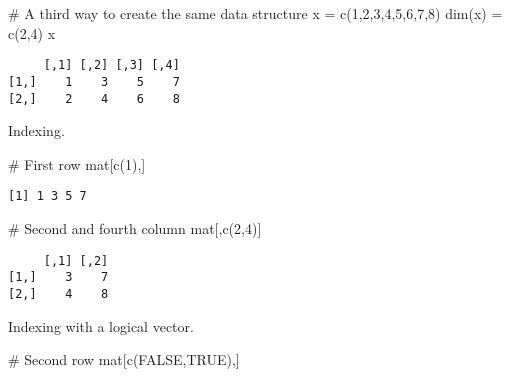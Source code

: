 \documentclass[
  letterpaper,
  DIV=11,
  numbers=noendperiod]{scrartcl}
\newenvironment{Shaded}{\begin{snugshade}}{\end{snugshade}}
\newcommand{\CommentTok}[1]{\textcolor[rgb]{0.37,0.37,0.37}{#1}}
\newcommand{\ConstantTok}[1]{\textcolor[rgb]{0.56,0.35,0.01}{#1}}
\newcommand{\DecValTok}[1]{\textcolor[rgb]{0.68,0.00,0.00}{#1}}
\newcommand{\FunctionTok}[1]{\textcolor[rgb]{0.28,0.35,0.67}{#1}}
\newcommand{\NormalTok}[1]{\textcolor[rgb]{0.00,0.23,0.31}{#1}}
\newcommand{\OtherTok}[1]{\textcolor[rgb]{0.00,0.23,0.31}{#1}}
\begin{document}
\begin{Shaded}
\begin{Highlighting}[]
\CommentTok{\# A third way to create the same data structure}
\NormalTok{x }\OtherTok{=} \FunctionTok{c}\NormalTok{(}\DecValTok{1}\NormalTok{,}\DecValTok{2}\NormalTok{,}\DecValTok{3}\NormalTok{,}\DecValTok{4}\NormalTok{,}\DecValTok{5}\NormalTok{,}\DecValTok{6}\NormalTok{,}\DecValTok{7}\NormalTok{,}\DecValTok{8}\NormalTok{)}
\FunctionTok{dim}\NormalTok{(x) }\OtherTok{=} \FunctionTok{c}\NormalTok{(}\DecValTok{2}\NormalTok{,}\DecValTok{4}\NormalTok{)}
\NormalTok{x}
\end{Highlighting}
\end{Shaded}

\begin{verbatim}
     [,1] [,2] [,3] [,4]
[1,]    1    3    5    7
[2,]    2    4    6    8
\end{verbatim}

Indexing.

\begin{Shaded}
\begin{Highlighting}[]
\CommentTok{\# First row}
\NormalTok{mat[}\FunctionTok{c}\NormalTok{(}\DecValTok{1}\NormalTok{),]}
\end{Highlighting}
\end{Shaded}

\begin{verbatim}
[1] 1 3 5 7
\end{verbatim}

\begin{Shaded}
\begin{Highlighting}[]
\CommentTok{\# Second and fourth column}
\NormalTok{mat[,}\FunctionTok{c}\NormalTok{(}\DecValTok{2}\NormalTok{,}\DecValTok{4}\NormalTok{)]}
\end{Highlighting}
\end{Shaded}

\begin{verbatim}
     [,1] [,2]
[1,]    3    7
[2,]    4    8
\end{verbatim}

Indexing with a logical vector.

\begin{Shaded}
\begin{Highlighting}[]
\CommentTok{\# Second row}
\NormalTok{mat[}\FunctionTok{c}\NormalTok{(}\ConstantTok{FALSE}\NormalTok{,}\ConstantTok{TRUE}\NormalTok{),]}
\end{Highlighting}
\end{Shaded}
\end{document}
